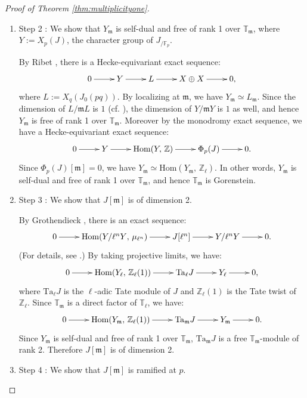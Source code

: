 \documentclass[a4paper, 12pt]{amsart}
\theoremstyle{definition}
\theoremstyle{remark}
\numberwithin{equation}{section} \numberwithin{table}{section}
\begin{document}
\begin{proof}[Proof of Theorem \ref{thm:multiplicityone}]
\begin{enumerate}
\item Step 2 : We show that $Y_{{\mathfrak{m}}}$ is self-dual and free of rank 1 over ${{\mathbb{T}}}_{{\mathfrak{m}}}$, where $Y:=X_p(J)$, the character group of $J_{/{{\mathbb{F}}}_p}$.

By Ribet \cite{R90}, there is a Hecke-equivariant exact sequence:
$$
\xymatrix{
0 \ar[r] & Y \ar[r] & L \ar[r] & X \oplus X \ar[r] & 0,
}
$$
where $L:=X_q(J_0(pq))$.
By localizing at ${{\mathfrak{m}}}$, we have $Y_{{\mathfrak{m}}} \simeq L_{{\mathfrak{m}}}$.
Since the dimension of $L/{{{\mathfrak{m}}} L}$ is $1$ (cf. \cite[Theorem 4.5.(4)]{Yoo14}), the dimension of $Y/{{{\mathfrak{m}}} Y}$ is $1$ as well, and hence $Y_{{\mathfrak{m}}}$ is free of rank 1 over ${{\mathbb{T}}}_{{\mathfrak{m}}}$.
Moreover by the monodromy exact sequence, we have a Hecke-equivariant exact sequence:
$$
\xymatrix{
0 \ar[r] & Y \ar[r] & {{\mathrm{Hom}}}(Y, \,{{\mathbb{Z}}}) \ar[r] & \Phi_p(J) \ar[r] & 0.
}
$$
Since $\Phi_p(J)[{{\mathfrak{m}}}]=0$, we have $Y_{{\mathfrak{m}}} \simeq {{\mathrm{Hom}}}(Y_{{\mathfrak{m}}}, \,{{\mathbb{Z}}}_{\ell})$. In other words, $Y_{{\mathfrak{m}}}$ is self-dual and free of rank 1 over ${{\mathbb{T}}}_{{\mathfrak{m}}}$, and hence ${{\mathbb{T}}}_{{\mathfrak{m}}}$ is Gorenstein.

\item Step 3 : We show that $J[{{\mathfrak{m}}}]$ is of dimension 2.

By Grothendieck \cite{Gro72}, there is an exact sequence:
$$
\xymatrix{
0 \ar[r] & {{\mathrm{Hom}}}(Y/{\ell^n Y}, \,\mu_{\ell^n}) \ar[r] & J[\ell^n] \ar[r] & Y/{\ell^n Y} \ar[r] & 0.
}
$$
(For details, see \cite[]{R76}.)
By taking projective limits, we have:
$$
\xymatrix{
0 \ar[r] & {{\mathrm{Hom}}}(Y_{\ell}, \,{{\mathbb{Z}}}_{\ell}(1)) \ar[r] & {{\mathrm{Ta}}}_{\ell} J \ar[r] & Y_{\ell} \ar[r] & 0,
}
$$
where ${{\mathrm{Ta}}}_{\ell}J$ is the $\ell$-adic Tate module of $J$ and ${{\mathbb{Z}}}_{\ell}(1)$ is the Tate twist of ${{\mathbb{Z}}}_{\ell}$. Since ${{\mathbb{T}}}_{{\mathfrak{m}}}$ is a direct factor of ${{\mathbb{T}}}_{\ell}$, we have: 
$$
\xymatrix{
0 \ar[r] & {{\mathrm{Hom}}}(Y_{{\mathfrak{m}}}, \,{{\mathbb{Z}}}_{\ell}(1)) \ar[r] & {{\mathrm{Ta}}}_{{\mathfrak{m}}} J \ar[r] & Y_{{\mathfrak{m}}} \ar[r] & 0.
}
$$
Since $Y_{{\mathfrak{m}}}$ is self-dual and free of rank 1 over ${{\mathbb{T}}}_{{\mathfrak{m}}}$, ${{\mathrm{Ta}}}_{{\mathfrak{m}}} J$ is a free ${{\mathbb{T}}}_{{\mathfrak{m}}}$-module of rank 2. Therefore $J[{{\mathfrak{m}}}]$ is of dimension 2.

\item Step 4 : We show that $J[{{\mathfrak{m}}}]$ is ramified at $p$.


\end{enumerate}
\end{proof}
\end{document}
